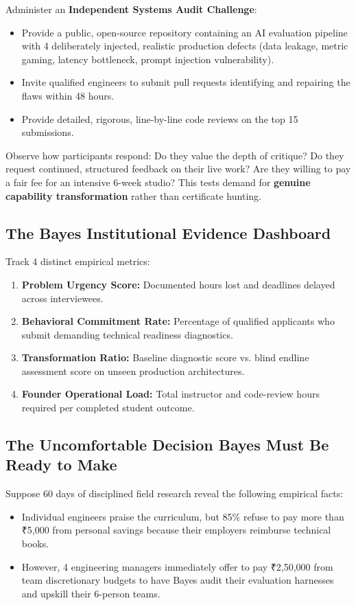 Administer an \textbf{Independent Systems Audit Challenge}:
\begin{itemize}[leftmargin=1.2em,itemsep=0.2ex]
  \item Provide a public, open-source repository containing an AI evaluation pipeline with 4 deliberately injected, realistic production defects (data leakage, metric gaming, latency bottleneck, prompt injection vulnerability).
  \item Invite qualified engineers to submit pull requests identifying and repairing the flaws within 48 hours.
  \item Provide detailed, rigorous, line-by-line code reviews on the top 15 submissions.
\end{itemize}
Observe how participants respond: Do they value the depth of critique? Do they request continued, structured feedback on their live work? Are they willing to pay a fair fee for an intensive 6-week studio? This tests demand for \textbf{genuine capability transformation} rather than certificate hunting.

\subsection{The Bayes Institutional Evidence Dashboard}

Track 4 distinct empirical metrics:
\begin{enumerate}[leftmargin=1.2em,itemsep=0.2ex]
  \item \textbf{Problem Urgency Score:} Documented hours lost and deadlines delayed across interviewees.
  \item \textbf{Behavioral Commitment Rate:} Percentage of qualified applicants who submit demanding technical readiness diagnostics.
  \item \textbf{Transformation Ratio:} Baseline diagnostic score vs. blind endline assessment score on unseen production architectures.
  \item \textbf{Founder Operational Load:} Total instructor and code-review hours required per completed student outcome.
\end{enumerate}

\subsection{The Uncomfortable Decision Bayes Must Be Ready to Make}

Suppose 60 days of disciplined field research reveal the following empirical facts:
\begin{itemize}[leftmargin=1.2em,itemsep=0.2ex]
  \item Individual engineers praise the curriculum, but 85\% refuse to pay more than ₹5,000 from personal savings because their employers reimburse technical books.
  \item However, 4 engineering managers immediately offer to pay ₹2,50,000 from team discretionary budgets to have Bayes audit their evaluation harnesses and upskill their 6-person teams.
\end{itemize}

